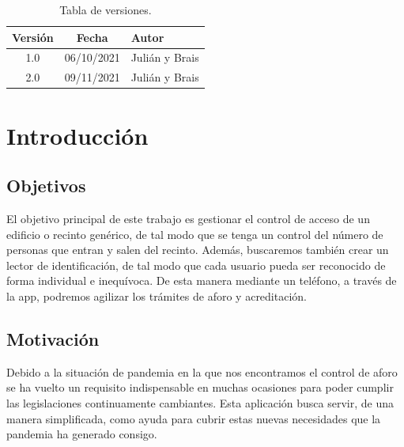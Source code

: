 \documentclass[a4paper,openright,12pt]{article}
\begin{document}


\tableofcontents

\vspace{3cm}

\begin{flushright}
\begin{table}[hbtp]
\begin{center}

\caption{Tabla de versiones.}
\label{tabla:versiones}
\small
\vspace{1ex}

\begin{tabular}{|c|c|l|}
    \hline
    Versión & Fecha & Autor \\
    \hline \hline
    1.0 & 06/10/2021 & Julián y Brais\\ \hline
    2.0 & 09/11/2021 & Julián y Brais\\ \hline
\end{tabular}

\end{center}
\end{table}
\end{flushright}
\newpage
{}

\section{Introducción}\label{cap.introduccion}

\subsection{Objetivos}
El objetivo principal de este trabajo es gestionar el control de acceso de un edificio o recinto genérico, de tal modo que se tenga un control del número de personas que entran y salen del recinto. Además, buscaremos también crear un lector de identificación, de tal modo que cada usuario pueda ser reconocido de forma individual e inequívoca. De esta manera mediante un teléfono, a través de la app, podremos agilizar los trámites de aforo y acreditación.
\subsection{Motivación}
Debido a la situación de pandemia en la que nos encontramos el control de aforo se ha vuelto un requisito indispensable en muchas ocasiones para poder cumplir las legislaciones continuamente cambiantes. Esta aplicación busca servir, de una manera simplificada, como ayuda para cubrir estas nuevas necesidades que la pandemia ha generado consigo.
\end{document}
